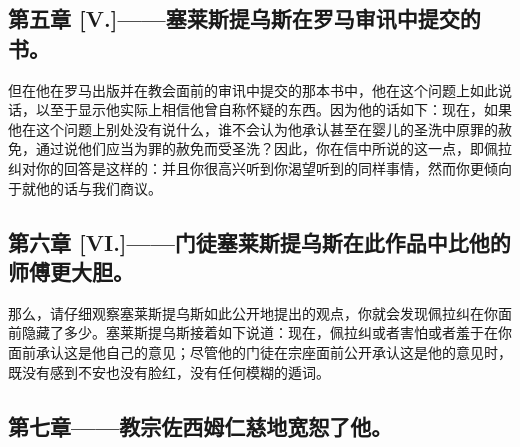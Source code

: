 
\subsection{第五章 [V.]——塞莱斯提乌斯在罗马审讯中提交的书。}

但在他在罗马出版并在教会面前的审讯中提交的那本书中，他在这个问题上如此说话，以至于显示他实际上相信他曾自称怀疑的东西。因为他的话如下：现在，如果他在这个问题上别处没有说什么，谁不会认为他承认甚至在婴儿的圣洗中原罪的赦免，通过说他们应当为罪的赦免而受圣洗？因此，你在信中所说的这一点，即佩拉纠对你的回答是这样的：并且你很高兴听到你渴望听到的同样事情，然而你更倾向于就他的话与我们商议。\par


\subsection{第六章 [VI.]——门徒塞莱斯提乌斯在此作品中比他的师傅更大胆。}

那么，请仔细观察塞莱斯提乌斯如此公开地提出的观点，你就会发现佩拉纠在你面前隐藏了多少。塞莱斯提乌斯接着如下说道：现在，佩拉纠或者害怕或者羞于在你面前承认这是他自己的意见；尽管他的门徒在宗座面前公开承认这是他的意见时，既没有感到不安也没有脸红，没有任何模糊的遁词。\par


\subsection{第七章——教宗佐西姆仁慈地宽恕了他。}

